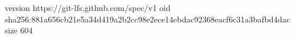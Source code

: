 version https://git-lfs.github.com/spec/v1
oid sha256:881a656cb21e5a34d419a2b2cc98e2ece14ebdac92368eacf6c31a3bafbd4dac
size 604
